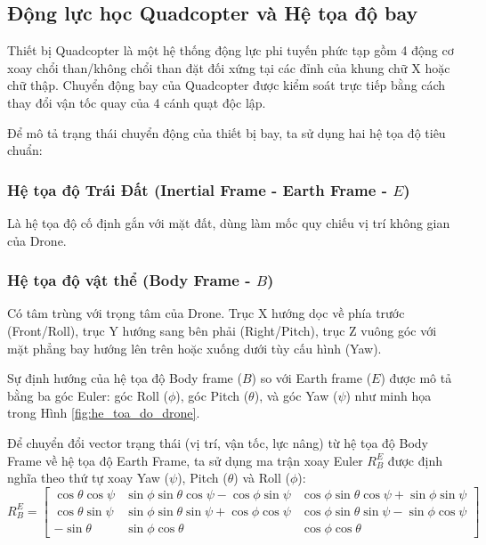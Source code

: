 
\subsection{Động lực học Quadcopter và Hệ tọa độ bay}

Thiết bị Quadcopter là một hệ thống động lực phi tuyến phức tạp gồm 4 động cơ xoay chổi than/không chổi than đặt đối xứng tại các đỉnh của khung chữ X hoặc chữ thập. Chuyển động bay của Quadcopter được kiểm soát trực tiếp bằng cách thay đổi vận tốc quay của 4 cánh quạt độc lập.

Để mô tả trạng thái chuyển động của thiết bị bay, ta sử dụng hai hệ tọa độ tiêu chuẩn:
\subsubsection{Hệ tọa độ Trái Đất (Inertial Frame - Earth Frame - $E$)}
Là hệ tọa độ cố định gắn với mặt đất, dùng làm mốc quy chiếu vị trí không gian của Drone.

\subsubsection{Hệ tọa độ vật thể (Body Frame - $B$)}
Có tâm trùng với trọng tâm của Drone. Trục X hướng dọc về phía trước (Front\slash Roll), trục Y hướng sang bên phải (Right\slash Pitch), trục Z vuông góc với mặt phẳng bay hướng lên trên hoặc xuống dưới tùy cấu hình (Yaw).

Sự định hướng của hệ tọa độ Body frame ($B$) so với Earth frame ($E$) được mô tả bằng ba góc Euler: góc Roll ($\phi$), góc Pitch ($\theta$), và góc Yaw ($\psi$) như minh họa trong Hình \ref{fig:he_toa_do_drone}.

Để chuyển đổi vector trạng thái (vị trí, vận tốc, lực nâng) từ hệ tọa độ Body Frame về hệ tọa độ Earth Frame, ta sử dụng ma trận xoay Euler $R_{B}^{E}$ được định nghĩa theo thứ tự xoay Yaw ($\psi$), Pitch ($\theta$) và Roll ($\phi$):
\begin{equation}
R_{B}^{E} = \begin{bmatrix} 
\cos\theta\cos\psi & \sin\phi\sin\theta\cos\psi - \cos\phi\sin\psi & \cos\phi\sin\theta\cos\psi + \sin\phi\sin\psi \\
\cos\theta\sin\psi & \sin\phi\sin\theta\sin\psi + \cos\phi\cos\psi & \cos\phi\sin\theta\sin\psi - \sin\phi\cos\psi \\
-\sin\theta & \sin\phi\cos\theta & \cos\phi\cos\theta
\end{bmatrix}
\end{equation}

